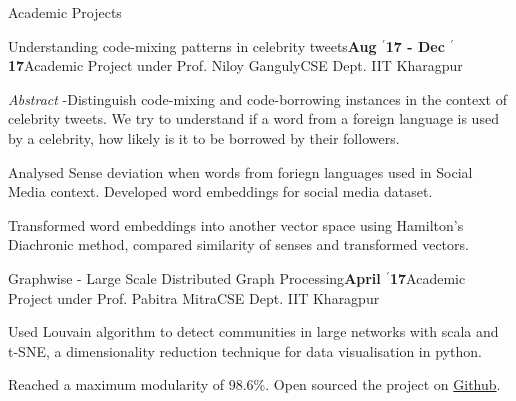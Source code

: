 \documentclass{resume} %
\begin{document}
\begin{rSection}{Academic Projects}
\begin{rSubsection}{ \large Understanding code-mixing patterns in celebrity tweets}{\textbf{\large Aug $^{\prime}$17 - Dec $^{\prime}$17}}{Academic Project under Prof. Niloy Ganguly}{CSE Dept. IIT Kharagpur}

\item \textit{Abstract} -Distinguish code-mixing and code-borrowing instances in the context of celebrity tweets. We try to understand if a word from a foreign language is used by a celebrity, how likely is it to be borrowed by their followers. 
\item Analysed Sense deviation when words from foriegn languages used in Social Media context. Developed word embeddings for social media dataset.
\item Transformed word embeddings into another vector space using Hamilton's Diachronic method, compared similarity of senses and transformed vectors.
\end{rSubsection}

\begin{rSubsection}{ \large Graphwise - Large Scale Distributed Graph Processing}{\textbf{\large April $^{\prime}$17}}{Academic Project under Prof. Pabitra Mitra}{CSE Dept. IIT Kharagpur}

\item Used Louvain algorithm to detect communities in large networks with scala and t-SNE, a dimensionality reduction technique for data visualisation in python.

\item Reached a maximum modularity of 98.6\%. Open sourced the project on \href{https://github.com/kaustubhhiware/Graphwise}{Github}.
\end{rSubsection}


\end{rSection}

\end{document}
